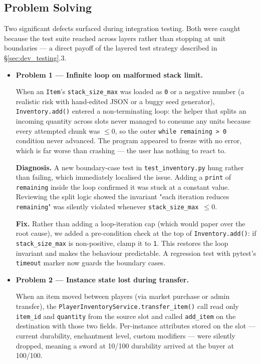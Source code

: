\documentclass[11pt,a4paper]{article}
\begin{document}
\subsection{Problem Solving}

Two significant defects surfaced during integration testing. Both were caught because the test suite reached across layers rather than stopping at unit boundaries — a direct payoff of the layered test strategy described in §\ref{sec:dev_testing}.3.

\begin{itemize}
    \item \textbf{Problem 1 — Infinite loop on malformed stack limit.}

When an \texttt{Item}'s \texttt{stack\_size\_max} was loaded as \texttt{0} or a negative number (a realistic risk with hand-edited JSON or a buggy seed generator), \texttt{Inventory.add()} entered a non-terminating loop: the helper that splits an incoming quantity across slots never managed to consume any units because every attempted chunk was \(\leq 0\), so the outer \texttt{while remaining > 0} condition never advanced. The program appeared to freeze with no error, which is far worse than crashing — the user has nothing to react to.

\textbf{Diagnosis.} A new boundary-case test in \texttt{test\_inventory.py} hung rather than failing, which immediately localised the issue. Adding a \texttt{print} of \texttt{remaining} inside the loop confirmed it was stuck at a constant value. Reviewing the split logic showed the invariant "each iteration reduces \texttt{remaining}" was silently violated whenever \texttt{stack\_size\_max \(\leq 0\)}.

\textbf{Fix.} Rather than adding a loop-iteration cap (which would paper over the root cause), we added a pre-condition check at the top of \texttt{Inventory.add()}: if \texttt{stack\_size\_max} is non-positive, clamp it to \texttt{1}. This restores the loop invariant and makes the behaviour predictable. A regression test with pytest's \texttt{timeout} marker now guards the boundary cases.

    \item \textbf{Problem 2 — Instance state lost during transfer.}

When an item moved between players (via market purchase or admin transfer), the \texttt{PlayerInventoryService.transfer\_item()} call read only \texttt{item\_id} and \texttt{quantity} from the source slot and called \texttt{add\_item} on the destination with those two fields. Per-instance attributes stored on the slot — current durability, enchantment level, custom modifiers — were silently dropped, meaning a sword at 10/100 durability arrived at the buyer at 100/100.


\end{itemize}
\end{document}
